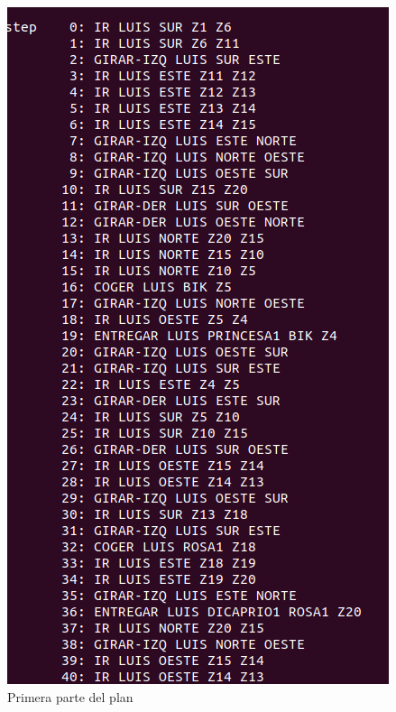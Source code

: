 \begin{figure}[H]
	\begin{minipage}[b]{0.5\linewidth}
		\centering
		\includegraphics[width=\linewidth]{ej3-1.png}
		\caption{Primera parte del plan}
		\label{fig:ej3-1}
	\end{minipage}
	\hspace{0.5cm}
	\begin{minipage}[b]{0.5\linewidth}
		\centering

\end{minipage}
\end{figure}
